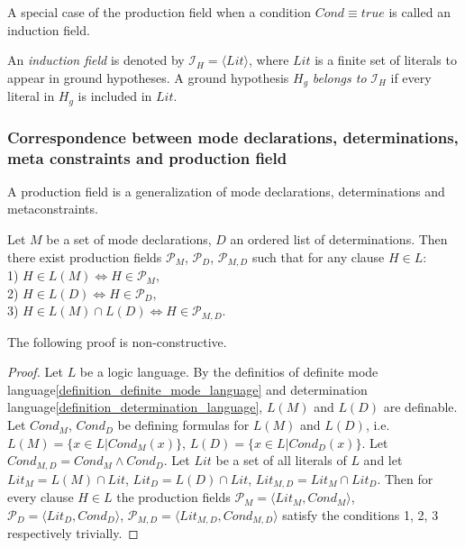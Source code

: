 A special case of the production field when a condition $Cond \equiv true$ is called an induction field.

\begin{defn}\cite{yamamoto2012inverse}\label{induction_field_definition}
An \emph{induction field} is denoted by $\mathcal{I}_H = \langle Lit \rangle$,
where $Lit$ is a finite
set of literals to appear in ground hypotheses.
A ground hypothesis $H_g$ \emph{belongs to} $\mathcal{I}_H$ if
every literal in $H_g$ is included in $Lit$.
\end{defn}

\subsubsection{Correspondence between mode declarations, determinations, meta constraints and production field}
A production field is a generalization of mode declarations, determinations and metaconstraints.

\begin{proposition}\label{md_d_pf_correspondence_proposition}
Let $M$ be a set of mode declarations, $D$ an ordered list of determinations. Then there exist production fields
$\mathcal{P}_M$,
$\mathcal{P}_D$,
$\mathcal{P}_{M,D}$
such that for any clause $H \in L$:\\
1) $H \in L(M) \iff H \in \mathcal{P}_M$,\\
2) $H \in L(D) \iff H \in \mathcal{P}_D$,\\
3) $H \in L(M) \cap L(D) \iff H \in \mathcal{P}_{M,D}$.\\
\end{proposition}
The following proof is non-constructive.
\begin{proof}
Let $L$ be a logic language. By the definitios of definite mode language\ref{definition_definite_mode_language} and determination language\ref{definition_determination_language}, $L(M)$ and $L(D)$ are definable.
Let $Cond_M$, $Cond_D$ be defining formulas for $L(M)$ and $L(D)$, i.e. $L(M)=\{x \in L | Cond_M(x)\}$, $L(D)=\{x \in L | Cond_D(x)\}$.
Let $Cond_{M,D}=Cond_M \land Cond_D$. Let $Lit$ be a set of all literals of $L$ and let
$Lit_M=L(M) \cap Lit$,
$Lit_D=L(D) \cap Lit$,
$Lit_{M,D}=Lit_M \cap Lit_D$.
Then for every clause $H \in L$ the production fields
$\mathcal{P}_M=\langle Lit_M, Cond_M \rangle$,
$\mathcal{P}_D=\langle Lit_D, Cond_D \rangle$,
$\mathcal{P}_{M,D}=\langle Lit_{M,D}, Cond_{M,D} \rangle$
satisfy the conditions 1, 2, 3 respectively trivially.
\end{proof}


